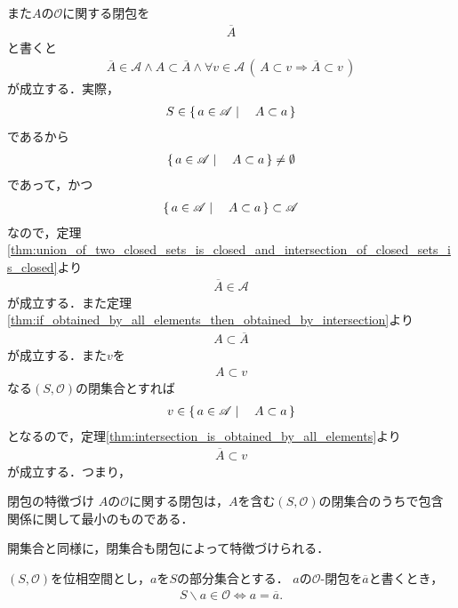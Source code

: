 	また$A$の$\mathscr{O}$に関する閉包を
	\begin{align}
		\overline{A}
	\end{align}
	と書くと
	\begin{align}
		\overline{A} \in \mathscr{A} \wedge A \subset \overline{A} \wedge
		\forall v \in \mathscr{A}\, \left(\, A \subset v \Longrightarrow \overline{A} \subset v\, \right)
		\label{fom:closure_is_the_smallest_closed_set}
	\end{align}
	が成立する．実際，
	\begin{align}
		S \in \left\{\, a \in \mathscr{A} \mid \quad A \subset a\, \right\}
	\end{align}
	であるから
	\begin{align}
		\left\{\, a \in \mathscr{A} \mid \quad A \subset a\, \right\} \neq \emptyset
	\end{align}
	であって，かつ
	\begin{align}
		\left\{\, a \in \mathscr{A} \mid \quad A \subset a\, \right\} \subset \mathscr{A}
	\end{align}
	なので，定理\ref{thm:union_of_two_closed_sets_is_closed_and_intersection_of_closed_sets_is_closed}より
	\begin{align}
		\overline{A} \in \mathscr{A}
	\end{align}
	が成立する．また定理\ref{thm:if_obtained_by_all_elements_then_obtained_by_intersection}より
	\begin{align}
		A \subset \overline{A}
	\end{align}
	が成立する．また$v$を
	\begin{align}
		A \subset v
	\end{align}
	なる$(S,\mathscr{O})$の閉集合とすれば
	\begin{align}
		v \in \left\{\, a \in \mathscr{A} \mid \quad A \subset a\, \right\}
	\end{align}
	となるので，定理\ref{thm:intersection_is_obtained_by_all_elements}より
	\begin{align}
		\overline{A} \subset v
	\end{align}
	が成立する．つまり，
	\begin{itembox}[l]{閉包の特徴づけ}
		$A$の$\mathscr{O}$に関する閉包は，$A$を含む$(S,\mathscr{O})$の閉集合のうちで包含関係に関して最小のものである．
	\end{itembox}
	
	開集合と同様に，閉集合も閉包によって特徴づけられる．
	\begin{screen}
		\begin{thm}[閉集合は自身の閉包に一致する集合である]
		\label{thm:closed_set_coincides_with_its_closure}
			$(S,\mathscr{O})$を位相空間とし，$a$を$S$の部分集合とする．
			$a$の$\mathscr{O}$-閉包を$\overline{a}$と書くとき，
			\begin{align}
				S \backslash a \in \mathscr{O} \Longleftrightarrow a = \overline{a}.
			\end{align}
		\end{thm}
	\end{screen}
	
